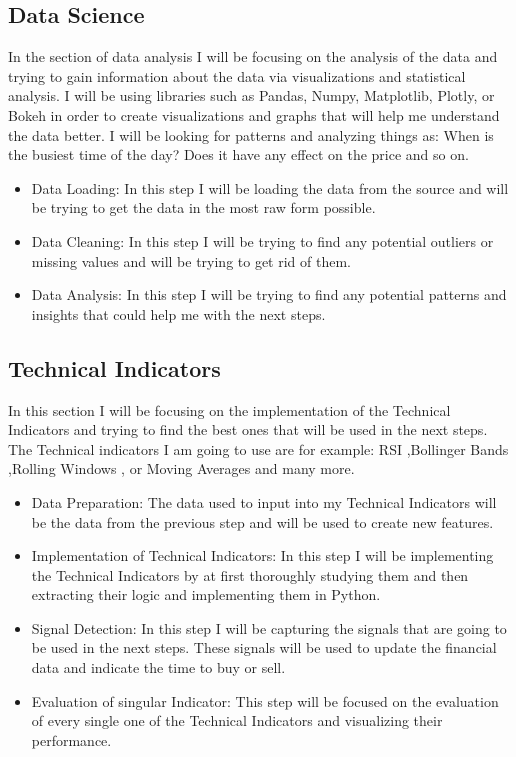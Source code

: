 \documentclass{imc-inf}
\begin{document}
	\subsection{Data Science}
	In the section of data analysis I will be focusing on the analysis of the data and trying to gain information about 
	the data via visualizations and statistical analysis. I will be using libraries such as Pandas, Numpy, Matplotlib, Plotly, or Bokeh 
	in order to create visualizations and graphs that will help me understand the data better. I will be looking for patterns and analyzing things as:
	When is the busiest time of the day? Does it have any effect on the price and so on.
	\begin{itemize}
		\item Data Loading: In this step I will be loading the data from the source and will be trying to get the data in the most raw form possible.
		\item Data Cleaning: In this step I will be trying to find any potential outliers or missing values and will be trying to get rid of them.
		\item  Data Analysis: In this step I will be trying to find any potential patterns and insights that could help me with the next steps.
	\end{itemize}
	
	\subsection{Technical Indicators}
	In this section I will be focusing on the implementation of the Technical Indicators and trying to find the best ones that will be used in the next steps.
	The Technical indicators I am going to use are for example: RSI \cite{RSI_1},Bollinger Bands \cite{Bollinger_Bands_1},Rolling Windows \cite{Rolling_window_1}, or Moving Averages \cite{Moving_average_1} and many more.
	\begin{itemize}
		\item Data Preparation: The data used to input into my Technical Indicators will be the data from the previous step and will be used to create new features.
		\item Implementation of Technical Indicators: In this step I will be implementing the Technical Indicators by at first thoroughly studying them and then extracting 
		their logic and implementing them in Python. 
		\item Signal Detection: In this step I will be capturing the signals that are going to be used in the next steps. These signals will be used to update the financial data and indicate the time to buy or sell.
		\item Evaluation of singular Indicator: This step will be focused on the evaluation of every single one of the Technical Indicators and visualizing their performance.
	\end{itemize}
	
\end{document}
